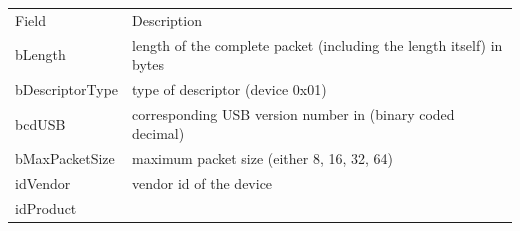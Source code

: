 \begin{longtable}[]{@{}ll@{}}
\toprule
\begin{minipage}[t]{0.47\columnwidth}\raggedright\strut
{Field}
\strut\end{minipage} &
\begin{minipage}[t]{0.47\columnwidth}\raggedright\strut
{Description}
\strut\end{minipage}\tabularnewline
\begin{minipage}[t]{0.47\columnwidth}\raggedright\strut
{bLength}
\strut\end{minipage} &
\begin{minipage}[t]{0.47\columnwidth}\raggedright\strut
{length of the complete packet (including the length itself) in bytes}

{}
\strut\end{minipage}\tabularnewline
\begin{minipage}[t]{0.47\columnwidth}\raggedright\strut
{bDescriptorType}
\strut\end{minipage} &
\begin{minipage}[t]{0.47\columnwidth}\raggedright\strut
{type of descriptor (device 0x01)}
\strut\end{minipage}\tabularnewline
\begin{minipage}[t]{0.47\columnwidth}\raggedright\strut
{bcdUSB}
\strut\end{minipage} &
\begin{minipage}[t]{0.47\columnwidth}\raggedright\strut
{corresponding USB version number in (binary coded decimal)}
\strut\end{minipage}\tabularnewline
\begin{minipage}[t]{0.47\columnwidth}\raggedright\strut
{bMaxPacketSize}
\strut\end{minipage} &
\begin{minipage}[t]{0.47\columnwidth}\raggedright\strut
{maximum packet size (either 8, 16, 32, 64)}
\strut\end{minipage}\tabularnewline
\begin{minipage}[t]{0.47\columnwidth}\raggedright\strut
{idVendor}
\strut\end{minipage} &
\begin{minipage}[t]{0.47\columnwidth}\raggedright\strut
{vendor id of the device}
\strut\end{minipage}\tabularnewline
\begin{minipage}[t]{0.47\columnwidth}\raggedright\strut
{idProduct}
\strut\end{minipage} &

\end{longtable}
